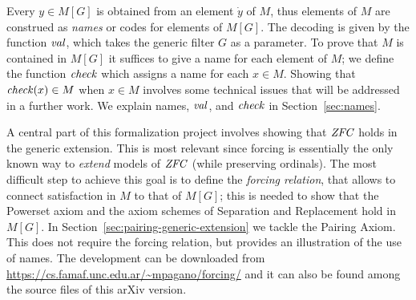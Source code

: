 %
Every  $y \in M[G]$ is obtained from an element $\dot y$ of $M$, thus
elements of $M$ are construed as \emph{names} or codes for elements of
$M[G]$.
The decoding is given by the function
$\operatorname{\mathit{val}}$, which takes the generic filter $G$ as a parameter. To
prove that $M$ is contained in $M[G]$ it suffices to give a name for
each element of $M$; we define the function $\operatorname{\mathit{check}}$ which assigns
a name for each $x\in M$. Showing that $\operatorname{\mathit{check}}(x)\in M$
when $x\in M$ involves some technical issues that will
be addressed in a further work. We explain names, $\operatorname{\mathit{val}}$, and
$\operatorname{\mathit{check}}$ in Section~\ref{sec:names}.

A central part of this formalization project involves showing that
$\mathit{ZFC}$ holds in the generic extension. This is most relevant since
forcing is essentially the only known way to \emph{extend} models of
$\mathit{ZFC}$ (while preserving ordinals). The most difficult step to achieve
this goal is to define the \emph{forcing relation}, that allows to
connect satisfaction in $M$ to that of $M[G]$; this is needed to show
that the Powerset axiom and the axiom schemes of Separation and
Replacement hold in $M[G]$. In
Section~\ref{sec:pairing-generic-extension}
 we tackle the Pairing
Axiom. This does not require the forcing relation, but provides an
illustration of the use of names. The development can be downloaded
from \url{https://cs.famaf.unc.edu.ar/~mpagano/forcing/} and it can
also be found among the source files of this arXiv version.
   
%

%
%
%
%
%
